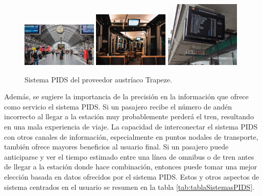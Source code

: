 \begin{figure}[h]
	\centering
	\includegraphics[width=0.32\textwidth]{./Figures/TrapezeStation.jpg}
	\includegraphics[width=0.32\textwidth]{./Figures/TrapezeOnboard.jpg}
	\includegraphics[width=0.32\textwidth]{./Figures/TrapezeTimetable.jpg}
	\caption{Sistema PIDS del proveedor austríaco Trapeze. \protect\footnotemark}
	\label{fig:Trapeze}
\end{figure}


Además, se sugiere la importancia de la precisión en la información que ofrece como servicio el sistema PIDS. Si un pasajero recibe el número de andén incorrecto al llegar a la estación muy probablemente perderá el tren, resultando en una mala experiencia de viaje. La capacidad de interconectar el sistema PIDS con otros canales de información, especialmente en puntos nodales de transporte, también ofrece mayores beneficios al usuario final. Si un pasajero puede anticiparse y ver el tiempo estimado entre una línea de omnibus o de tren antes de llegar a la estación donde hace combinación, entonces puede tomar una mejor elección basada en datos ofrecidos por el sistema PIDS. Estos y otros aspectos de sistema centrados en el usuario se resumen en la tabla \ref{tab:tablaSistemasPIDS}.\\

